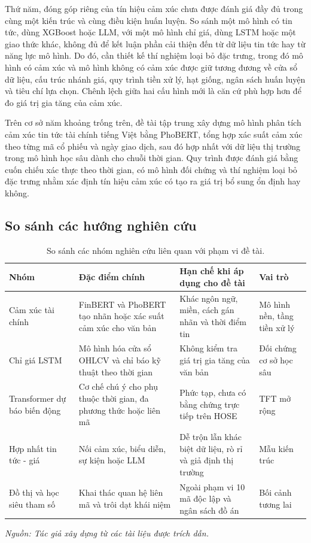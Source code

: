 Thứ năm, đóng góp riêng của tín hiệu cảm xúc chưa được đánh giá đầy đủ trong
cùng một kiến trúc và cùng điều kiện huấn luyện. So sánh một mô hình có tin tức,
dùng XGBoost hoặc LLM, với một mô hình chỉ giá, dùng LSTM hoặc một giao thức khác,
không đủ để kết luận phần cải thiện đến từ dữ liệu tin tức hay từ năng lực mô hình.
Do đó, cần thiết kế thí nghiệm loại bỏ đặc trưng, trong đó mô hình có cảm xúc và mô
hình không có cảm xúc được giữ tương đương về cửa sổ dữ liệu, cấu trúc nhánh giá,
quy trình tiền xử lý, hạt giống, ngân sách huấn luyện và tiêu chí lựa chọn. Chênh lệch
giữa hai cấu hình mới là căn cứ phù hợp hơn để đo giá trị gia tăng của cảm xúc.

Trên cơ sở năm khoảng trống trên, đề tài tập trung xây dựng mô hình phân tích cảm xúc
tin tức tài chính tiếng Việt bằng PhoBERT, tổng hợp xác suất cảm xúc theo từng mã cổ
phiếu và ngày giao dịch, sau đó hợp nhất với dữ liệu thị trường trong mô hình học sâu
dành cho chuỗi thời gian. Quy trình được đánh giá bằng cuốn chiếu xác thực theo thời gian, có mô
hình đối chứng và thí nghiệm loại bỏ đặc trưng nhằm xác định tín hiệu cảm xúc có tạo
ra giá trị bổ sung ổn định hay không.

\subsection{So sánh các hướng nghiên cứu}

\begin{table}[H]
  \centering
  \caption{So sánh các nhóm nghiên cứu liên quan với phạm vi đề tài.}
  \label{tab:tq-so-sanh}
  \begin{tabular}{p{3.0cm} p{4.1cm} p{4.1cm} p{2.6cm}}
    \toprule
    Nhóm & Đặc điểm chính & Hạn chế khi áp dụng cho đề tài & Vai trò \\
    \midrule
    Cảm xúc tài chính & FinBERT và PhoBERT tạo nhãn hoặc xác suất cảm xúc cho văn bản
    \cite{Yang2020_200608097v2,Nguyen2020_200300744v3} & Khác ngôn ngữ, miền,
    cách gán nhãn và thời điểm tin & Mô hình nền, tầng tiền xử lý \\
    Chỉ giá LSTM & Mô hình hóa cửa sổ OHLCV và chỉ báo kỹ thuật theo thời gian
\cite{Halder2022_221107392v1} & Không kiểm tra giá trị gia tăng của văn bản & Đối chứng cơ sở học sâu \\
    Transformer dự báo biến động & Cơ chế chú ý cho phụ thuộc thời gian, đa phương thức hoặc
    liên mã \cite{Boyle2023_230503835v1,Omranpour2024_241210540v1} & Phức tạp,
    chưa có bằng chứng trực tiếp trên HOSE & TFT mở rộng \\
    Hợp nhất tin tức - giá & Nối cảm xúc, biểu diễn, sự kiện hoặc LLM
    \cite{Chen2021_210708721v1,Elahi2024_241101368v1} & Dễ trộn lẫn khác biệt dữ liệu,
    rò rỉ và giả định thị trường & Mẫu kiến trúc \\
    Đồ thị và học siêu tham số & Khai thác quan hệ liên mã và trôi dạt khái niệm
    \cite{Xu2021_211013716v2,Zhao2023_230609862v3} & Ngoài phạm vi 10 mã độc lập và
    ngân sách đồ án & Bối cảnh tương lai \\
    \bottomrule
  \end{tabular}
\noindent\textit{Nguồn: Tác giả xây dựng từ các tài liệu được trích dẫn.}
\end{table}

